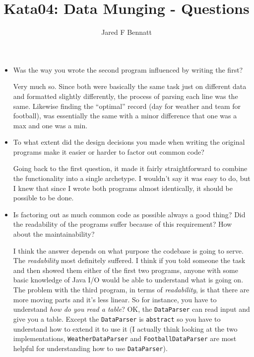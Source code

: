 \documentclass[11pt]{article} %
\title{Kata04: Data Munging - Questions}
\author{Jared F Bennatt}
\begin{document}
\maketitle

\begin{itemize}
\item Was the way you wrote the second program influenced by writing the first?

Very much so. Since both were basically the same task just on different data and
formatted slightly differently, the process of parsing each line was the same. 
Likewise finding the ``optimal'' record (day for weather and team for football),
was essentially the same with a minor difference that one was a max and one was 
a min.

\item To what extent did the design decisions you made when writing the original
programs make it easier or harder to factor out common code?

Going back to the first question, it made it fairly straightforward to combine 
the functionality into a single archetype. I wouldn't say it was easy to do, 
but I knew that since I wrote both programs almost identically, it should be 
possible to be done.

\item Is factoring out as much common code as possible always a good thing? Did 
the readability of the programs suffer because of this requirement? How about 
the maintainability?

I think the answer depends on what purpose the codebase is going to serve. The 
\textit{readability} most definitely suffered. I think if you told someone the 
task and then showed them either of the first two programs, anyone with some 
basic knowledge of Java I/O would be able to understand what is going on. The 
problem with the third program, in terms of \textit{readability}, is that there 
are more moving parts and it's less linear. So for instance, you have to 
understand \textit{how do you read a table}? OK, the \texttt{DataParser} can 
read input and give you a table. Except the \texttt{DataParser} is 
\texttt{abstract} so you have to understand how to extend it to use it (I 
actually think looking at the two implementations, \texttt{WeatherDataParser} 
and \texttt{FootballDataParser} are most helpful for understanding how to use 
\texttt{DataParser}).


\end{itemize}
\end{document}
